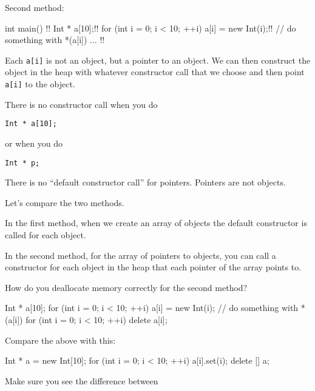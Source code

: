 Second method:
\begin{consolethree}[escapeinside=!!]
int main()
{   !!
    Int * a[10];!! 
    for (int i = 0; i < 10; ++i)
        a[i] = new Int(i);!!
    // do something with *(a[i])
    ... !!
}
\end{consolethree}

 Each \texttt{a[i]} is not an object, but a pointer
to an object. We can then construct the object in the heap with whatever
constructor call that we choose and then point \texttt{a[i]} to the
object.

There is no constructor call when you do
\begin{center}
\texttt{Int * a[10];}
\end{center}
or when you do
\begin{center}
\texttt{Int * p;}
\end{center}
 There is no ``default constructor call'' for
pointers. Pointers are not objects.

Let's compare the two methods.

In the first method, when we create an array of objects the default
constructor is called for each object.

In the second method, for the array of pointers to objects, you can call
a constructor for each object in the heap that each pointer of the array
points to.

How do you deallocate memory correctly for the second method?

\begin{console}
Int * a[10];
for (int i = 0; i < 10; ++i)
    a[i] = new Int(i);
// do something with *(a[i])
for (int i = 0; i < 10; ++i)
    delete a[i];
\end{console}
Compare the above with this:
\begin{console}
Int * a = new Int[10];
for (int i = 0; i < 10; ++i)
    a[i].set(i);
delete [] a;
\end{console}
Make sure you see the difference between

